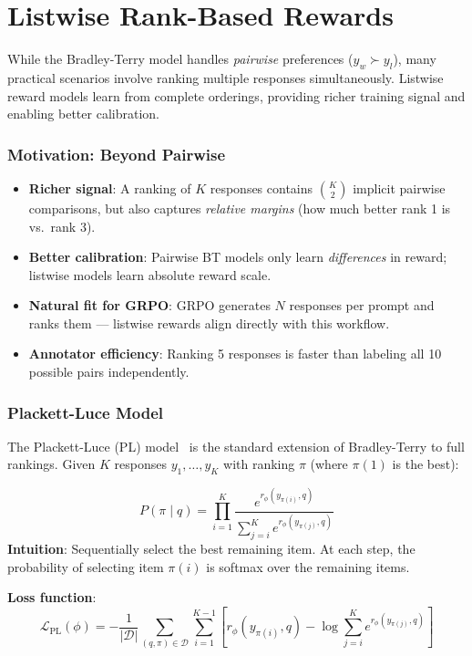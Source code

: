 \section{Listwise Rank-Based Rewards}
\label{listwise-rank-based-rewards}

While the Bradley-Terry model handles \emph{pairwise} preferences ($y_w \succ y_l$), many practical scenarios involve ranking multiple responses simultaneously. Listwise reward models learn from complete orderings, providing richer training signal and enabling better calibration.

\subsubsection*{Motivation: Beyond Pairwise}
\label{motivation-beyond-pairwise}

\begin{intuitionbox}
\begin{itemize}
  \item \textbf{Richer signal}: A ranking of $K$ responses contains $\binom{K}{2}$ implicit pairwise comparisons, but also captures \emph{relative margins} (how much better rank 1 is vs.~rank 3).
  \item \textbf{Better calibration}: Pairwise BT models only learn \emph{differences} in reward; listwise models learn absolute reward scale.
  \item \textbf{Natural fit for GRPO}: GRPO generates $N$ responses per prompt and ranks them --- listwise rewards align directly with this workflow.
  \item \textbf{Annotator efficiency}: Ranking 5 responses is faster than labeling all 10 possible pairs independently.
\end{itemize}
\end{intuitionbox}

\subsubsection*{Plackett-Luce Model}
\label{plackett-luce-model}

The Plackett-Luce (PL) model~\cite{plackett1975analysis} is the standard extension of Bradley-Terry to full rankings. Given $K$ responses $y_1, \ldots, y_K$ with ranking $\pi$ (where $\pi(1)$ is the best):

\begin{keybox}
\[
P(\pi \mid q) = \prod_{i=1}^{K} \frac{e^{r_\phi(y_{\pi(i)}, q)}}{\sum_{j=i}^{K} e^{r_\phi(y_{\pi(j)}, q)}}
\]
 \textbf{Intuition}: Sequentially select the best remaining item. At each step, the probability of selecting item $\pi(i)$ is softmax over the remaining items.

\textbf{Loss function}: 
\[
\mathcal{L}_{\text{PL}}(\phi) = -\frac{1}{|\mathcal{D}|} \sum_{(q, \pi) \in \mathcal{D}} \sum_{i=1}^{K-1} \left[ r_\phi(y_{\pi(i)}, q) - \log \sum_{j=i}^{K} e^{r_\phi(y_{\pi(j)}, q)} \right]
\]
\end{keybox}

